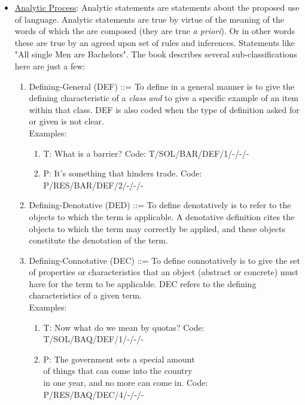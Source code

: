 \documentclass[10pt, letterpaper]{article}
\begin{document}
\begin{itemize}
\begin{itemize}
\item \uline{Analytic Process}:  Analytic statements are statements about the proposed use of language. Analytic statements are true by virtue of the meaning of the words of which the are composed (they are true \emph{a priori}). Or in other words these are true by an agreed upon set of rules and inferences. Statements like "All single Men are Bachelors". The book describes several sub-classifications here are just a few:
\begin{enumerate}
\item Defining-General (DEF) ::= To define in a general manner is to give the defining characteristic of a \emph{class} \emph{and} to give a specific example of an item within that class. DEF is also coded when the type of definition asked for or given is not clear. \\
Examples:
\begin{enumerate}
\item T: What is a barrier? Code: T/SOL/BAR/DEF/1/-/-/-
\item P: It's something that hinders trade. Code: P/RES/BAR/DEF/2/-/-/-
\end{enumerate}
\item Defining-Denotative (DED) ::= To define denotatively is to refer to the objects to which the term is applicable. A denotative definition cites the objects to which the term may correctly be applied, and these objects constitute the denotation of the term.
\item Defining-Connotative (DEC) ::= To define connotatively is to give the set of properties or characteristics that an object (abstract or concrete) must have for the term to be applicable. DEC refers to the defining characteristics of a given term. \\
Examples:
\begin{enumerate}
\item T: Now what do we mean by quotas? Code: T/SOL/BAQ/DEF/1/-/-/-
\item P: The government sets a special amount \\
of things that can come into the country\\
in one year, and no more can come in. Code: P/RES/BAQ/DEC/4/-/-/-
\end{enumerate}
\end{enumerate}


\end{itemize}
\end{itemize}
\end{document}
